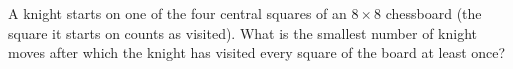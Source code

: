 A knight starts on one of the four central squares of an $8\times8$ chessboard (the square it starts on counts as visited). What is the smallest number of knight moves after which the knight has visited every square of the board at least once?
